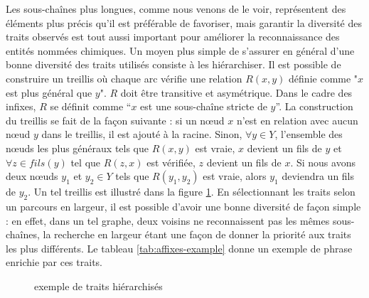 \documentclass[12pt,a4paper,times,twoside,openright]{report}
\begin{document}
Les sous-chaînes plus longues, comme nous venons de le voir, représentent des éléments plus précis qu'il est préférable de favoriser, mais garantir la diversité des traits observés est tout aussi important pour améliorer la reconnaissance des entités nommées chimiques. Un moyen plus simple de s'assurer en général d'une bonne diversité des traits utilisés consiste à les hiérarchiser. Il est possible de construire un treillis où chaque arc vérifie une relation $R(x,y)$ définie comme "$x$ est plus général que $y$". $R$ doit être transitive et asymétrique. Dans le cadre des infixes, $R$ se définit comme ``$x$ est une sous-chaîne stricte de $y$''. La construction du treillis se fait de la façon suivante : si un n\oe ud $x$ n'est en relation avec aucun n\oe ud $y$ dans le treillis, il est ajouté à la racine. Sinon, $\forall y \in Y$, l'ensemble des n\oe uds les plus généraux tels que $R(x,y)$ est vraie, $x$ devient un fils de $y$ et $\forall z \in fils(y)$ tel que $R(z,x)$ est vérifiée, $z$ devient un fils de $x$. Si nous avons deux n\oe uds $y_{1}$ et $y_{2} \in Y$ tels que $R(y_{1},y_{2})$ est vraie, alors $y_{1}$ deviendra un fils de $y_{2}$. Un tel treillis est illustré dans la figure \ref{fig:hierarchy}. En sélectionnant les traits selon un parcours en largeur, il est possible d'avoir une bonne diversité de façon simple : en effet, dans un tel graphe, deux voisins ne reconnaissent pas les mêmes sous-chaînes, la recherche en largeur étant une façon de donner la priorité aux traits les plus différents. Le tableau \ref{tab:affixes-example} donne un exemple de phrase enrichie par ces traits.

\begin{figure}[ht!]
\centering
{}
\caption{exemple de traits hiérarchisés}
\label{fig:hierarchy}
\end{figure}
\end{document}
